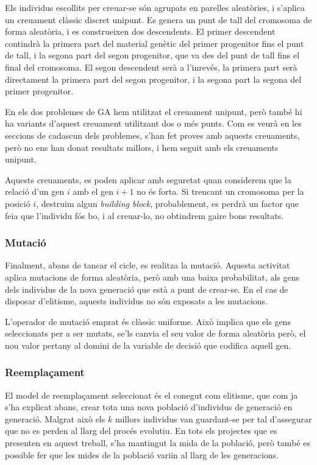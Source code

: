 Els individus escollits per creuar-se són agrupats en parelles aleatòries, i
s'aplica un creuament clàssic discret unipunt.  Es genera un punt de tall del
cromosoma de forma aleatòria, i es construeixen dos descendents. El primer
descendent contindrà la primera part del material genètic del primer progenitor
fins el punt de tall, i la segona part del segon progenitor, que va des del punt
de tall fins el final del cromosoma. El segon descendent serà a l'inrevés, la
primera part serà directament la primera part del segon progenitor, i la segona
part la segona del primer progenitor.

En els dos problemes de GA hem utilitzat el creuament unipunt, però també hi
ha variants d'aquest creuament utilitzant dos o més punts.  Com es veurà en les
seccions de cadascun dels problemes, s'han fet proves amb aquests creuaments,
però no ens han donat resultats millors, i hem seguit amb els creuaments
unipunt.

Aquests creuaments, es poden aplicar amb seguretat quan considerem que la
relació d'un gen $i$ amb el gen $i+1$ no és forta.  Si trencant un cromosoma per
la posició $i$, destruim algun \emph{building block}, probablement, es perdrà un
factor que feia que l'individu fós bo, i al creuar-lo, no obtindrem gaire bons
resultats.

\subsubsection{Mutació}

Finalment, abans de tancar el cicle, es realitza la mutació. Aquesta activitat
aplica mutacions de forma aleatòria, però amb una baixa probabilitat, als gens
dels individus de la nova generació que està a punt de crear-se. En el cas de
disposar d'elitisme, aquests individus no són exposats a les mutacions.

L'operador de mutació emprat és clàssic uniforme. Això implica que els gens
seleccionats per a ser mutats, se'ls canvia el seu valor de forma aleatòria
però, el nou valor pertany al domini de la variable de decisió que codifica
aquell gen.

\subsubsection{Reemplaçament}

El model de reemplaçament seleccionat és el conegut com elitisme, que com ja
s'ha explicat abans, crear tota una nova població d'individus de generació en
generació. Malgrat això els $k$ millors individus van guardant-se per tal
d'assegurar que no es perden al llarg del procés evolutiu.  En tots els
projectes que es presenten en aquest treball, s'ha mantingut la mida de la
població, però també es possible fer que les mides de la població variin al
llarg de les generacions.

